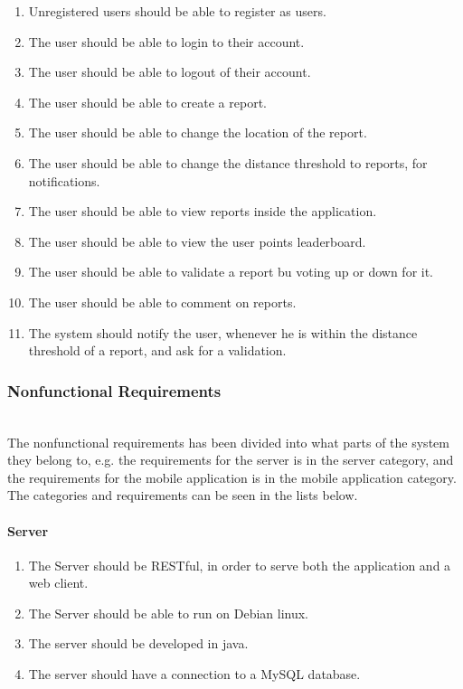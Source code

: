 \begin{enumerate}[label=F\arabic*]
\item Unregistered users should be able to register as users.
\item The user should be able to login to their account.
\item The user should be able to logout of their account.
\item The user should be able to create a report.
\item The user should be able to change the location of the report.
\item The user should be able to change the distance threshold to reports, for notifications.
\item The user should be able to view reports inside the application.
\item The user should be able to view the user points leaderboard.
\item The user should be able to validate a report bu voting up or down for it.
\item The user should be able to comment on reports.
\item The system should notify the user, whenever he is within the distance threshold of a report, and ask for a validation.
\end{enumerate}

\subsubsection{Nonfunctional Requirements}~\\
The nonfunctional requirements has been divided into what parts of the system they belong to, e.g. the requirements for the server is in the server category, and the requirements for the mobile application is in the mobile application category.
The categories and requirements can be seen in the lists below.

\newpage
\paragraph{Server}
\begin{enumerate}[label=NS\arabic*]
\item The Server should be RESTful, in order to serve both the application and a web client.
\item The Server should be able to run on Debian linux.
\item The server should be developed in java.
\item The server should have a connection to a MySQL database.
\end{enumerate}

